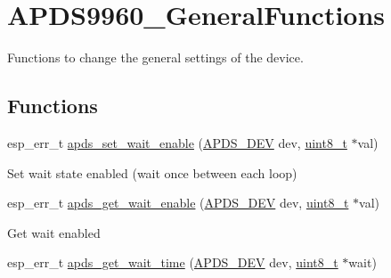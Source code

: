 \hypertarget{group__APDS9960__GeneralFunctions}{}\section{A\+P\+D\+S9960\+\_\+\+General\+Functions}
\label{group__APDS9960__GeneralFunctions}


Functions to change the general settings of the device.  


\subsection*{Functions}
\begin{DoxyCompactItemize}
\item 
esp\+\_\+err\+\_\+t \hyperlink{group__APDS9960__GeneralFunctions_ga2472490688d4bd0d2f999e2c8eee99b3}{apds\+\_\+set\+\_\+wait\+\_\+enable} (\hyperlink{structAPDS9960__Driver}{A\+P\+D\+S\+\_\+\+D\+EV} dev, \hyperlink{vl53l0x__types_8h_aba7bc1797add20fe3efdf37ced1182c5}{uint8\+\_\+t} $\ast$val)
\begin{DoxyCompactList}\small\item\em 
\begin{DoxyItemize}
\item Set wait state enabled (wait once between each loop) 
\end{DoxyItemize}\end{DoxyCompactList}\item 
esp\+\_\+err\+\_\+t \hyperlink{group__APDS9960__GeneralFunctions_ga64832cb79d542441fc1389fa66334f12}{apds\+\_\+get\+\_\+wait\+\_\+enable} (\hyperlink{structAPDS9960__Driver}{A\+P\+D\+S\+\_\+\+D\+EV} dev, \hyperlink{vl53l0x__types_8h_aba7bc1797add20fe3efdf37ced1182c5}{uint8\+\_\+t} $\ast$val)
\begin{DoxyCompactList}\small\item\em 
\begin{DoxyItemize}
\item Get wait enabled 
\end{DoxyItemize}\end{DoxyCompactList}\item 
esp\+\_\+err\+\_\+t \hyperlink{group__APDS9960__GeneralFunctions_ga77d198f3395c1f220aa93263592b6b0a}{apds\+\_\+get\+\_\+wait\+\_\+time} (\hyperlink{structAPDS9960__Driver}{A\+P\+D\+S\+\_\+\+D\+EV} dev, \hyperlink{vl53l0x__types_8h_aba7bc1797add20fe3efdf37ced1182c5}{uint8\+\_\+t} $\ast$wait)
\begin{DoxyCompactList}\small\item\em 

\end{DoxyCompactList}
\end{DoxyCompactItemize}
